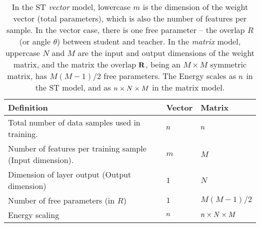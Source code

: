 \begin{table}[H]
\centering
\begin{tabular}{l|l|l}
\toprule
 \textbf{Definition} & \textbf{Vector} & \textbf{Matrix} \\
\midrule
 Total number of data samples used in training. & $n$ & $n$ \\
 Number of features per training sample (Input dimension). & $m$ & $M$ \\
 Dimension of layer output (Output dimension)  & $1$ & $N$ \\
 Number of free parameters (in $R$) & $1$ & $M(M-1)/2$ \\
 Energy scaling & $n$ & $n\times N\times M$ \\
\bottomrule
\end{tabular}
\caption{In the ST \Perceptron \emph{vector} model, lowercase $m$ is the dimension of the weight vector (total parameters), which is also the number of features per sample. In the vector case, there is one free parameter -- the overlap $R$ (or angle $\theta$) between student and teacher. In the \SETOL \emph{matrix} model,  uppercase $N$ and $M$ are the input and output dimensions of the weight matrix, and the
matrix the overlap $\mathbf{R}$, being an $M\times M$ symmetric matrix, has $M(M-1)/2$ free parameters.
The Energy scales as $n$ in the ST \Perceptron model, and as $n\times N\times M$ in the \SETOL matrix model.
}
\label{tab:dim_notation}
\end{table}

